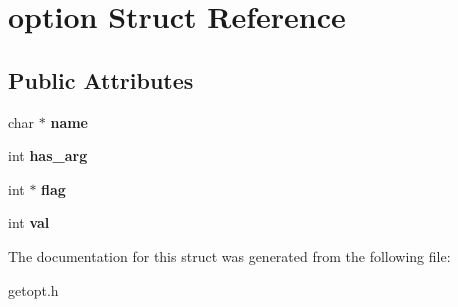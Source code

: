 \hypertarget{structoption}{\section{option Struct Reference}
\label{structoption}
}
\subsection*{Public Attributes}
\begin{DoxyCompactItemize}
\item 
\hypertarget{structoption_a92c850a23c7828c1dba453bf8d15e1f0}{char $\ast$ {\bfseries name}}\label{structoption_a92c850a23c7828c1dba453bf8d15e1f0}

\item 
\hypertarget{structoption_a90d7ee9a51eea5c002682dbd0af149e4}{int {\bfseries has\-\_\-arg}}\label{structoption_a90d7ee9a51eea5c002682dbd0af149e4}

\item 
\hypertarget{structoption_ab366eea5fe7be25c1928328ba715e353}{int $\ast$ {\bfseries flag}}\label{structoption_ab366eea5fe7be25c1928328ba715e353}

\item 
\hypertarget{structoption_a13bd155ec3b405d29c41ab8d0793be11}{int {\bfseries val}}\label{structoption_a13bd155ec3b405d29c41ab8d0793be11}

\end{DoxyCompactItemize}


The documentation for this struct was generated from the following file\-:\begin{DoxyCompactItemize}
\item 
getopt.\-h\end{DoxyCompactItemize}
